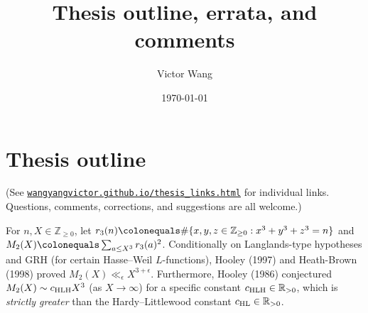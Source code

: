 \documentclass[12pt]{article}
\title{Thesis outline, errata, and comments}
\author{Victor Wang}
\date{\today}
\begin{document}
\maketitle

\section{Thesis outline}

(See \href{https://wangyangvictor.github.io/thesis_links.html}{\nolinkurl{wangyangvictor.github.io/thesis_links.html}} for individual links.
Questions, comments, corrections, and suggestions are all welcome.)

For $n,X\in \mathbb{Z}_{\geq0}$,
let $r_3(n)\colonequals \#\{x,y,z\in \mathbb{Z}_{\geq0}: x^3+y^3+z^3=n\}$ and $M_2(X)\colonequals \sum_{a\leq X^3}r_3(a)^2$.
Conditionally on Langlands-type hypotheses and GRH (for certain Hasse--Weil $L$-functions),
Hooley (1997) and Heath-Brown (1998) proved $M_2(X)\ll_\epsilon X^{3+\epsilon}$.
Furthermore,
Hooley (1986) conjectured $M_2(X)\sim c_{\textnormal{HLH}}X^3$ (as $X\to\infty$) for a specific constant $c_{\textnormal{HLH}}\in \mathbb{R}_{>0}$,
which is \emph{strictly greater} than the Hardy--Littlewood constant $c_{\textnormal{HL}}\in \mathbb{R}_{>0}$.
\end{document}
